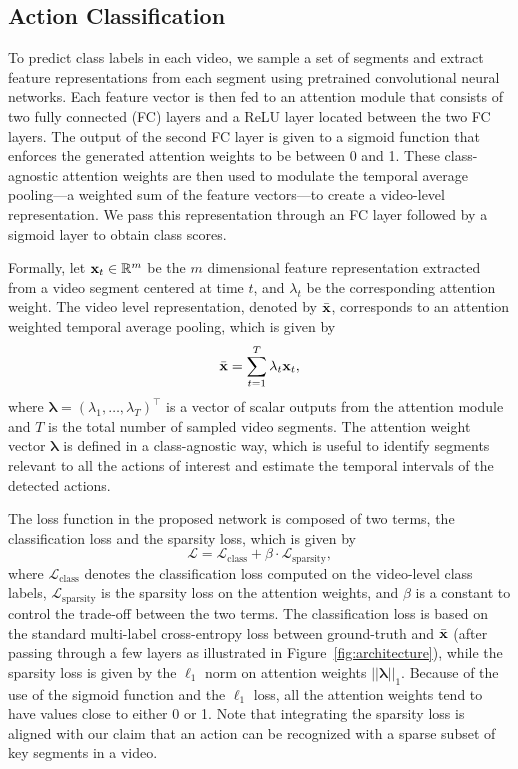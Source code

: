 \documentclass[10pt,twocolumn,letterpaper]{article}
\begin{document}
\subsection{Action Classification}
\label{sub:weakly}
To predict class labels in each video, we sample a set of segments and extract feature representations from each segment using pretrained convolutional neural networks.
Each feature vector is then fed to an attention module that consists of two fully connected (FC) layers and a ReLU layer located between the two FC layers.
The output of the second FC layer is given to a sigmoid function that enforces the generated attention weights to be between 0 and 1.
These class-agnostic attention weights are then used to modulate the temporal average pooling---a weighted sum of the feature vectors---to create a video-level representation.
We pass this representation through an FC layer followed by a sigmoid layer to obtain class scores.


Formally, let ${\bf x}_t \in \mathbb{R}^m$ be the $m$ dimensional feature representation extracted from a video segment centered at time $t$, and $\lambda_t$ be the corresponding attention weight. 
The video level representation, denoted by $\bar{{\bf x}}$, corresponds to an attention weighted temporal average pooling, which is given by
\begin{equation}
\bar{{\bf x}} = \sum_{t=1}^T \lambda_t {\bf x}_t,
\label{eq:video_feature}
\end{equation}
where ${\bm \lambda} = (\lambda_1, \dots, \lambda_T)^{\top}$ is a vector of scalar outputs from the attention module and $T$ is the total number of sampled video segments.
The attention weight vector ${\bm \lambda}$ is defined in a class-agnostic way, which is useful to identify segments relevant to all the actions of interest and estimate the temporal intervals of the detected actions.


The loss function in the proposed network is composed of two terms, the classification loss and the sparsity loss, which is given by\begin{equation}
\mathcal{L} = \mathcal{L}_\text{class} + \beta \cdot \mathcal{L}_\text{sparsity}, 
\label{eq:loss}
\end{equation}
where $\mathcal{L}_\text{class}$ denotes the classification loss computed on the video-level class labels, $\mathcal{L}_\text{sparsity}$ is the sparsity loss on the attention weights, and $\beta$ is a constant to control the trade-off between the two terms.
The classification loss is based on the standard multi-label cross-entropy loss between ground-truth and $\bar{{\bf x}}$ (after passing through a few layers as illustrated in Figure~\ref{fig:architecture}), while the sparsity loss is given by the $\ell_1$ norm on attention weights $|| {\bm \lambda} ||_1$.
Because of the use of the sigmoid function and the $\ell_1$ loss, all the attention weights tend to have values close to either 0 or 1.
Note that integrating the sparsity loss is aligned with our claim that an action can be recognized with a sparse subset of key segments in a video.
\end{document}
